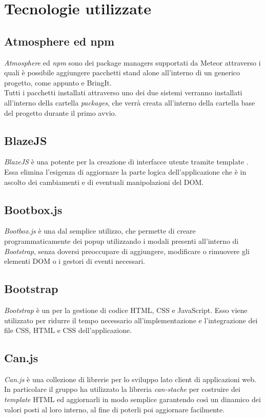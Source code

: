 \section{Tecnologie utilizzate}

\subsection{Atmosphere ed npm}
\textit{Atmosphere} ed \textit{npm} sono dei package managers supportati da Meteor attraverso i quali è possibile aggiungere pacchetti stand alone all'interno di un generico progetto, come appunto  e BringIt. \\
Tutti i pacchetti installati attraverso uno dei due sistemi verranno installati all'interno della cartella \textit{packages}, che verrà creata all'interno della cartella base del progetto durante il primo avvio.

\subsection{BlazeJS}
\textit{BlazeJS} è una potente  per la creazione di interfacce utente tramite template . Essa elimina l'esigenza di aggiornare la parte logica dell'applicazione che è in ascolto dei cambiamenti e di eventuali manipolazioni del DOM.

\subsection{Bootbox.js}
\textit{Bootbox.js} è una  dal semplice utilizzo, che permette di creare programmaticamente dei popup utilizzando i modali presenti all'interno di \textit{Bootstrap}, senza doversi preoccupare di aggiungere, modificare o rimuovere gli elementi DOM o i gestori di eventi  necessari.

\subsection{Bootstrap}
\textit{Bootstrap} è un  per la gestione di codice HTML, CSS e JavaScript. Esso viene utilizzato per ridurre il tempo necessario all'implementazione e l'integrazione dei file CSS, HTML e CSS dell'applicazione.

\subsection{Can.js}
\textit{Can.js} è una collezione di librerie per lo sviluppo lato client di applicazioni web. In particolare il gruppo ha utilizzato la libreria \textit{can-stache} per costruire dei \textit{template} HTML ed aggiornarli in modo semplice garantendo così un  dinamico dei valori posti al loro interno, al fine di poterli poi aggiornare facilmente.

